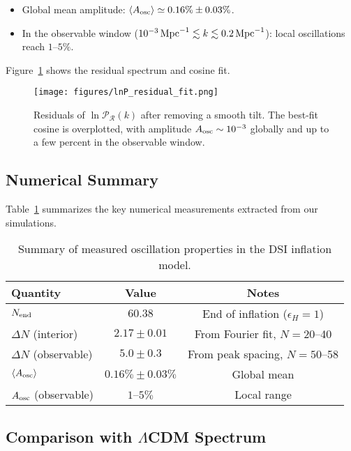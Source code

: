 \documentclass[reprint, amsmath, amssymb, aps, prd, nofootinbib]{revtex4-2}
\begin{document}
\begin{itemize}
    \item Global mean amplitude: $\langle A_{\rm osc}\rangle \simeq 0.16\% \pm 0.03\%$.
    \item In the observable window ($10^{-3}\,{\rm Mpc}^{-1} \lesssim k \lesssim 0.2\,{\rm Mpc}^{-1}$):
    local oscillations reach $1$--$5\%$.
\end{itemize}

Figure~\ref{fig:lnPres} shows the residual spectrum and cosine fit.

\begin{figure}[t]
\centering
\texttt{[image: figures/lnP\_residual\_fit.png]}
\caption{Residuals of $\ln \mathcal{P}_\mathcal{R}(k)$ after removing a smooth tilt.
The best-fit cosine is overplotted, with amplitude $A_{\rm osc}\sim 10^{-3}$ globally
and up to a few percent in the observable window.}
\label{fig:lnPres}
\end{figure}

\subsection{Numerical Summary}

Table~\ref{tab:results} summarizes the key numerical measurements extracted from our
simulations.

\begin{table}[h]
\centering
\begin{tabular}{lcc}
\hline
Quantity & Value & Notes \\
\hline
$N_{\rm end}$ & $60.38$ & End of inflation ($\epsilon_H=1$) \\
$\Delta N$ (interior) & $2.17 \pm 0.01$ & From Fourier fit, $N=20$--40 \\
$\Delta N$ (observable) & $5.0 \pm 0.3$ & From peak spacing, $N=50$--58 \\
$\langle A_{\rm osc}\rangle$ & $0.16\% \pm 0.03\%$ & Global mean \\
$A_{\rm osc}$ (observable) & $1$--$5\%$ & Local range \\
\hline
\end{tabular}
\caption{Summary of measured oscillation properties in the DSI inflation model.}
\label{tab:results}
\end{table}

\subsection{Comparison with $\Lambda$CDM Spectrum}
\end{document}
